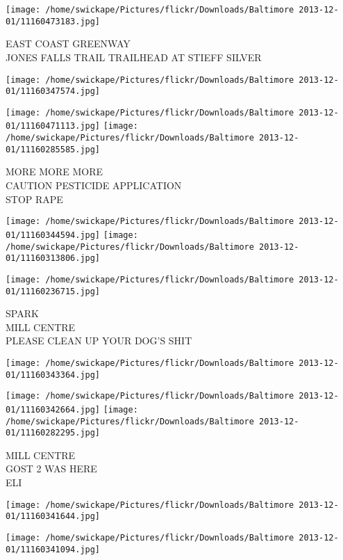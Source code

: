 \documentclass[10pt,letterpaper]{article}
\begin{document}
\vspace{0.25in}
\texttt{[image: /home/swickape/Pictures/flickr/Downloads/Baltimore 2013-12-01/11160473183.jpg]}

EAST COAST GREENWAY\\
JONES FALLS TRAIL TRAILHEAD AT STIEFF SILVER
\pagebreak

\texttt{[image: /home/swickape/Pictures/flickr/Downloads/Baltimore 2013-12-01/11160347574.jpg]}

\vspace{0.25in}
\texttt{[image: /home/swickape/Pictures/flickr/Downloads/Baltimore 2013-12-01/11160471113.jpg]}
\texttt{[image: /home/swickape/Pictures/flickr/Downloads/Baltimore 2013-12-01/11160285585.jpg]}

MORE MORE MORE\\
CAUTION PESTICIDE APPLICATION\\
STOP RAPE
\pagebreak

\texttt{[image: /home/swickape/Pictures/flickr/Downloads/Baltimore 2013-12-01/11160344594.jpg]}
\texttt{[image: /home/swickape/Pictures/flickr/Downloads/Baltimore 2013-12-01/11160313806.jpg]}

\texttt{[image: /home/swickape/Pictures/flickr/Downloads/Baltimore 2013-12-01/11160236715.jpg]}

SPARK\\
MILL CENTRE\\
PLEASE CLEAN UP YOUR DOG'S SHIT
\pagebreak

\texttt{[image: /home/swickape/Pictures/flickr/Downloads/Baltimore 2013-12-01/11160343364.jpg]}

\vspace{0.25in}
\texttt{[image: /home/swickape/Pictures/flickr/Downloads/Baltimore 2013-12-01/11160342664.jpg]}
\texttt{[image: /home/swickape/Pictures/flickr/Downloads/Baltimore 2013-12-01/11160282295.jpg]}

MILL CENTRE\\
GOST 2 WAS HERE\\
ELI
\pagebreak

\texttt{[image: /home/swickape/Pictures/flickr/Downloads/Baltimore 2013-12-01/11160341644.jpg]}

\vspace{0.25in}
\texttt{[image: /home/swickape/Pictures/flickr/Downloads/Baltimore 2013-12-01/11160341094.jpg]}
\end{document}
